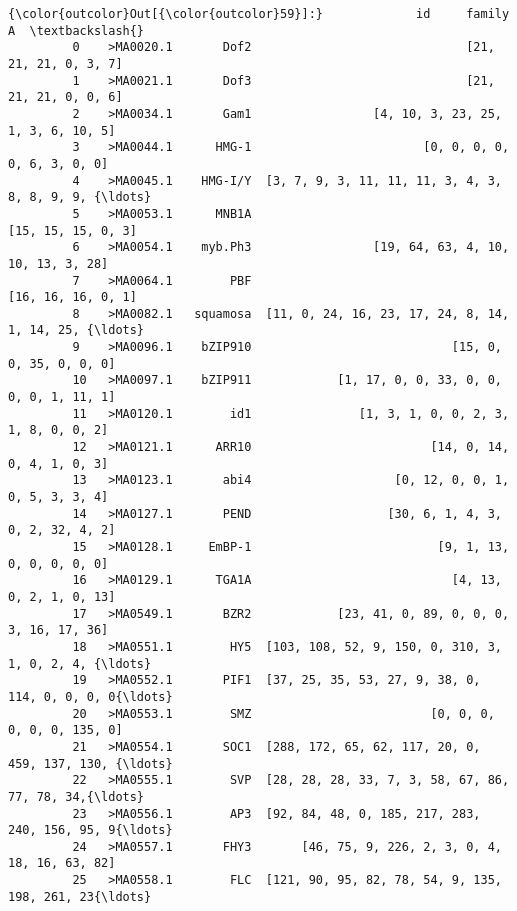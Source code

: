 \documentclass[11pt]{article}
\begin{document}
\begin{Verbatim}[commandchars=\\\{\}]
{\color{outcolor}Out[{\color{outcolor}59}]:}             id     family                                                  A  \textbackslash{}
         0    >MA0020.1       Dof2                              [21, 21, 21, 0, 3, 7]   
         1    >MA0021.1       Dof3                              [21, 21, 21, 0, 0, 6]   
         2    >MA0034.1       Gam1                 [4, 10, 3, 23, 25, 1, 3, 6, 10, 5]   
         3    >MA0044.1      HMG-1                        [0, 0, 0, 0, 0, 6, 3, 0, 0]   
         4    >MA0045.1    HMG-I/Y  [3, 7, 9, 3, 11, 11, 11, 3, 4, 3, 8, 8, 9, 9, {\ldots}   
         5    >MA0053.1      MNB1A                                 [15, 15, 15, 0, 3]   
         6    >MA0054.1    myb.Ph3                 [19, 64, 63, 4, 10, 10, 13, 3, 28]   
         7    >MA0064.1        PBF                                 [16, 16, 16, 0, 1]   
         8    >MA0082.1   squamosa  [11, 0, 24, 16, 23, 17, 24, 8, 14, 1, 14, 25, {\ldots}   
         9    >MA0096.1    bZIP910                            [15, 0, 0, 35, 0, 0, 0]   
         10   >MA0097.1    bZIP911            [1, 17, 0, 0, 33, 0, 0, 0, 0, 1, 11, 1]   
         11   >MA0120.1        id1               [1, 3, 1, 0, 0, 2, 3, 1, 8, 0, 0, 2]   
         12   >MA0121.1      ARR10                         [14, 0, 14, 0, 4, 1, 0, 3]   
         13   >MA0123.1       abi4                    [0, 12, 0, 0, 1, 0, 5, 3, 3, 4]   
         14   >MA0127.1       PEND                   [30, 6, 1, 4, 3, 0, 2, 32, 4, 2]   
         15   >MA0128.1     EmBP-1                          [9, 1, 13, 0, 0, 0, 0, 0]   
         16   >MA0129.1      TGA1A                            [4, 13, 0, 2, 1, 0, 13]   
         17   >MA0549.1       BZR2            [23, 41, 0, 89, 0, 0, 0, 3, 16, 17, 36]   
         18   >MA0551.1        HY5  [103, 108, 52, 9, 150, 0, 310, 3, 1, 0, 2, 4, {\ldots}   
         19   >MA0552.1       PIF1  [37, 25, 35, 53, 27, 9, 38, 0, 114, 0, 0, 0, 0{\ldots}   
         20   >MA0553.1        SMZ                         [0, 0, 0, 0, 0, 0, 135, 0]   
         21   >MA0554.1       SOC1  [288, 172, 65, 62, 117, 20, 0, 459, 137, 130, {\ldots}   
         22   >MA0555.1        SVP  [28, 28, 28, 33, 7, 3, 58, 67, 86, 77, 78, 34,{\ldots}   
         23   >MA0556.1        AP3  [92, 84, 48, 0, 185, 217, 283, 240, 156, 95, 9{\ldots}   
         24   >MA0557.1       FHY3       [46, 75, 9, 226, 2, 3, 0, 4, 18, 16, 63, 82]   
         25   >MA0558.1        FLC  [121, 90, 95, 82, 78, 54, 9, 135, 198, 261, 23{\ldots}   

\end{Verbatim}
\end{document}

